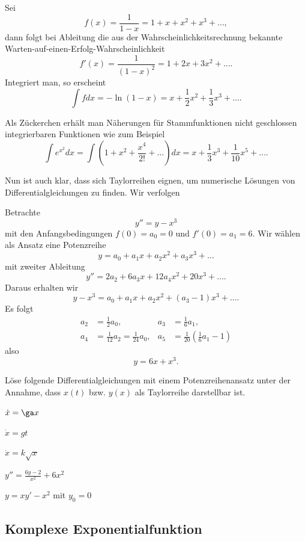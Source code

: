 \documentclass[%
11pt,%
twoside,%
titlepage,%
german,%
headsepline%
]{scrartcl}
\begin{document}
\begin{bsp}
Sei
$$f(x)=\frac{1}{1-x}=1+x+x^2+x^3+\dots,$$
dann folgt bei Ableitung die aus der Wahrscheinlichkeitsrechnung bekannte \glqq Warten-auf-einen-Erfolg-Wahrscheinlichkeit\grqq
$$f'(x)=\frac{1}{(1-x)^2}=1+2x+3x^2+\dots.$$
Integriert man, so erscheint
$$\int f dx=-\ln(1-x)=x+\frac{1}{2}x^2+\frac{1}{3}x^3+\dots.$$
\end{bsp}

\begin{bem}
Als Z\"uckerchen erh\"alt man N\"aherungen f\"ur Stammfunktionen nicht geschlossen integrierbaren Funktionen wie zum Beispiel
$$
\int e^{x^2}dx =\int\left(1+x^2+\frac{x^4}{2!}+\dots\right)dx=x+\frac{1}{3}x^3+\frac{1}{10}x^5+\dots.
$$
\end{bem}

Nun ist auch klar, dass sich Taylorreihen eignen, um numerische L\"osungen von Differentialgleichungen zu finden. Wir verfolgen
\begin{bsp}
Betrachte
$$y''=y-x^3$$
mit den Anfangsbedingungen $f(0)=a_0=0$ und $f'(0)=a_1=6$. Wir w\"ahlen als Ansatz eine Potenzreihe
$$y=a_0+a_1x+a_2x^2+a_3x^3+\dots$$
mit zweiter Ableitung
$$y''=2a_2+6a_3x+12a_4x^2+20x^3+\dots.$$
Daraus erhalten wir
$$y-x^3=a_0+a_1x+a_2x^2+(a_3-1)x^3+\dots.$$
Es folgt
\begin{align*}
a_2&=\frac{1}{2}a_0, &a_3&=\frac{1}{6}a_1,\\
a_4&=\frac{1}{12}a_2=\frac{1}{24}a_0, &a_5&=\frac{1}{20}(\frac{1}{6}a_1-1)
\end{align*}
also
$$y=6x+x^3.$$
\end{bsp}

\begin{ueb}
L\"ose folgende Differentialgleichungen mit einem Potenzreihenansatz unter der Annahme, dass $x(t)$ bzw. $y(x)$ als Taylorreihe darstellbar ist.
\begin{enumeratea}
\item $\dot{x}=\ga x$
\item $\dot{x}=gt$
\item $\dot{x}=k\sqrt{x}$
\item $y''=\frac{6y-2}{x^2}+6x^2$
\item $y=xy'-x^2$ mit $y_0=0$
\end{enumeratea}
\end{ueb}

\subsection{Komplexe Exponentialfunktion}
\end{document}
